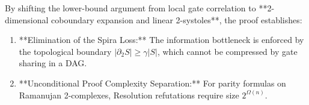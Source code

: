 \documentclass[11pt,a4paper]{article}
\theoremstyle{plain}
\theoremstyle{definition}
\theoremstyle{remark}
\begin{document}
By shifting the lower-bound argument from local gate correlation to **2-dimensional coboundary expansion and linear 2-systoles**, the proof establishes:
\begin{enumerate}
    \item **Elimination of the Spira Loss:** The information bottleneck is enforced by the topological boundary $|\partial_2 S| \ge \gamma |S|$, which cannot be compressed by gate sharing in a DAG.
    \item **Unconditional Proof Complexity Separation:** For parity formulas on Ramanujan 2-complexes, Resolution refutations require size $2^{\Omega(n)}$.
\end{enumerate}
\end{document}
